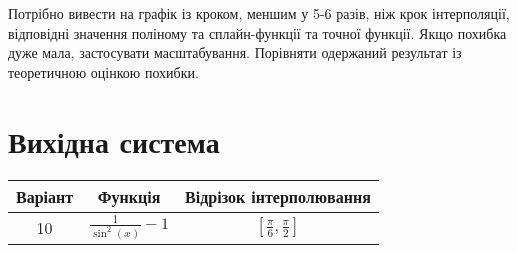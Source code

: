 \documentclass{article}
\begin{document}
    Потрібно вивести на графік із кроком, меншим у 5-6 разів, ніж крок інтерполяції, відповідні значення поліному та сплайн-функції та точної функції.
    Якщо похибка дуже мала, застосувати масштабування.
    Порівняти одержаний результат із теоретичною оцінкою похибки.

    \section{Вихідна система}
    \begin{tabular}{ |c|c|c| }
        \hline
        Варіант & Функція & Відрізок інтерполювання \\ 
        \hline
        10 & $ \frac{1}{\sin^2(x)} - 1 $ & $ [\frac{\pi}{6}, \frac{\pi}{2}] $ \\ 
        \hline
    \end{tabular}
\end{document}
